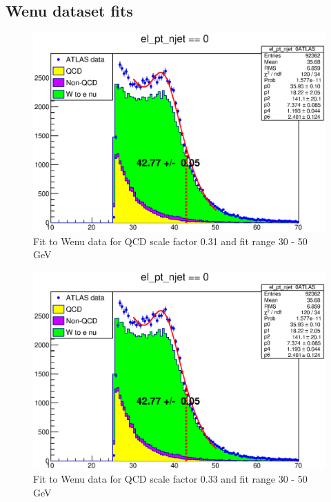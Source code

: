 \subsection{Wenu dataset fits}
\begin{figure}
\centering
\includegraphics[width=\textwidth]{data/img/halfmax_Wenu_031.eps}
\caption{Fit to Wenu data for QCD scale factor 0.31 and fit range 30 - 50 GeV}
\end{figure}
\begin{figure}
\centering
\includegraphics[width=\textwidth]{data/img/halfmax_Wenu_033.eps}
\caption{Fit to Wenu data for QCD scale factor 0.33 and fit range 30 - 50 GeV}
\end{figure}

